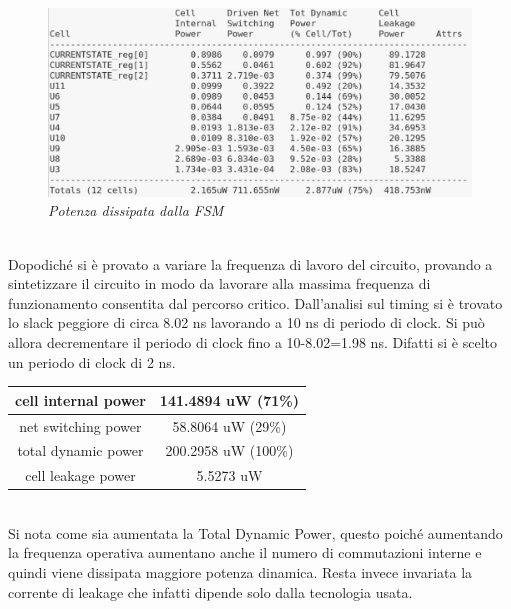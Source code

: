 \\
\begin{figure}[!htb]
	\centering
	\includegraphics[scale=0.6]{immagini/fsm_power_cell}
	\caption{\textit{Potenza dissipata dalla FSM}}
	\label{fsm_power_cell}
\end{figure} \\
\newpage
Dopodiché si è provato a variare la frequenza di lavoro del circuito, provando a sintetizzare il circuito in modo da lavorare alla massima frequenza di funzionamento consentita dal percorso critico. Dall’analisi sul timing si è trovato lo slack peggiore di circa 8.02 ns  lavorando a 10 ns di periodo di clock. Si può allora decrementare il periodo di clock fino a 10-8.02=1.98 ns. Difatti si è scelto un periodo di clock di 2 ns.
\\
\begin{table}[!h]\footnotesize
	\centering
	\begin{tabular}{|c|c|}
		\hline
		cell internal power & 141.4894 uW (71\%)\\
		\hline
		net switching power & 58.8064 uW (29\%)\\
		\hline
		\hline
		total dynamic power & 200.2958 uW (100\%)\\
		\hline
		cell leakage power & 5.5273 uW\\
		\hline
	\end{tabular}
\end{table} \\
 Si nota come sia aumentata la Total Dynamic Power, questo poiché aumentando la frequenza operativa aumentano anche il numero di commutazioni interne e quindi viene dissipata maggiore potenza dinamica. Resta invece invariata la corrente di leakage che infatti dipende solo dalla tecnologia usata.

